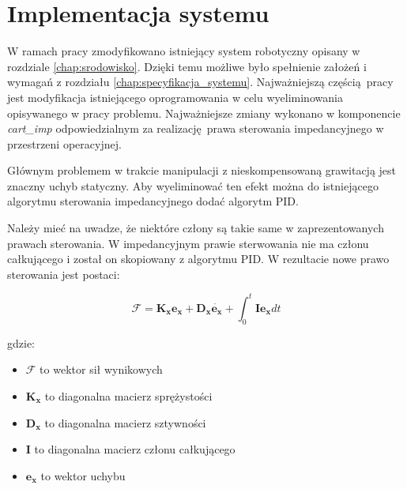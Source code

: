 
\chapter{Implementacja systemu\label{chap:implementacja_systemu}}
W ramach pracy zmodyfikowano istniejący system robotyczny opisany w rozdziale \ref{chap:srodowisko}. Dzięki temu możliwe było spełnienie założeń i wymagań z rozdziału \ref{chap:specyfikacja_systemu}.  Najważniejszą częścią pracy jest modyfikacja istniejącego oprogramowania w celu wyeliminowania opisywanego w pracy problemu. Najważniejsze zmiany wykonano w komponencie \textit{cart\_imp} odpowiedzialnym za realizację prawa sterowania impedancyjnego w przestrzeni operacyjnej.


Głównym problemem w trakcie manipulacji z nieskompensowaną grawitacją jest znaczny uchyb statyczny. Aby wyeliminować ten efekt można do istniejącego algorytmu sterowania impedancyjnego dodać algorytm PID. 

Należy mieć na uwadze, że niektóre człony są takie same w zaprezentowanych prawach sterowania. W impedancyjnym prawie sterwowania nie ma członu całkującego i został on skopiowany z algorytmu PID. W rezultacie nowe prawo sterowania jest postaci:

\begin{equation}
\boldsymbol{\mathcal{F}} = \boldsymbol{K_x}\boldsymbol{e_x} + \boldsymbol{D_x}\dot{\boldsymbol{e_x}} + \int_{0}^{t}  \boldsymbol{I}\boldsymbol{e_x}dt
\end{equation}

gdzie:
\begin{itemize}
    \item $\boldsymbol{\mathcal{F}}$ to wektor sił wynikowych
    \item $\boldsymbol{K_x}$ to diagonalna macierz sprężystości
    \item $\boldsymbol{D_x}$ to diagonalna macierz sztywności
    \item $\boldsymbol{I}$ to diagonalna macierz członu całkującego
    \item $\boldsymbol{e_x}$ to wektor uchybu
\end{itemize}
